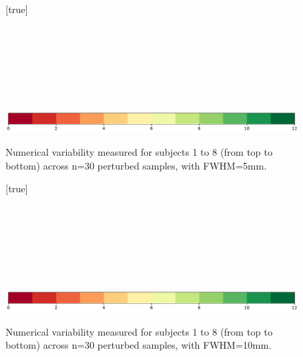 \documentclass[lettersize,journal]{IEEEtran}
\begin{document}
\begin{landscape}
  \begin{figure}
    \vspace*{-2cm}
    \centering
    [true] \\
     \\
     \\
     \\
     \\
     \\
     \\
     \\
    \includegraphics*[width=.7\linewidth]{figures/colorbar_sigbit_discrete.pdf}
    \caption{Numerical variability measured for subjects 1 to 8 (from top to bottom) across n=30 perturbed samples, with FWHM=5mm. }
    \label{fig:uncertainty-maps-5mm-disc}
  \end{figure}
\end{landscape}

\begin{landscape}
  \begin{figure}
    \vspace*{-2cm}
    \centering
    [true] \\
     \\
     \\
     \\
     \\
     \\
     \\
     \\
    \includegraphics*[width=.7\linewidth]{figures/colorbar_sigbit_discrete.pdf}
    \caption{Numerical variability measured for subjects 1 to 8 (from top to bottom) across n=30 perturbed samples, with FWHM=10mm. }
    \label{fig:uncertainty-maps-10mm-disc}
  \end{figure}
\end{landscape}
\end{document}
